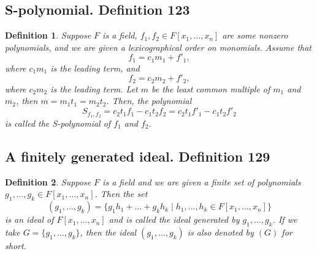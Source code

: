 \documentclass{article}
\newtheorem*{customdefinition}{Definition}
\begin{document}
\subsection*{S-polynomial. Definition 123}
\begin{customdefinition}
Suppose \( F \) is a field, \( f_1, f_2 \in F[x_1, \ldots, x_n] \) are some nonzero polynomials, and we are given a lexicographical order on monomials. Assume that 
\[
f_1 = c_1 m_1 + f'_1,
\]
where \( c_1 m_1 \) is the leading term, and
\[
f_2 = c_2 m_2 + f'_2,
\]
where \( c_2 m_2 \) is the leading term. Let \( m \) be the least common multiple of \( m_1 \) and \( m_2 \), then \( m = m_1 t_1 = m_2 t_2 \). Then, the polynomial
\[
S_{f_1, f_2} = c_2 t_1 f_1 - c_1 t_2 f_2 = c_2 t_1 f'_1 - c_1 t_2 f'_2
\]
is called the S-polynomial of \( f_1 \) and \( f_2 \).
\end{customdefinition}

\subsection*{A finitely generated ideal. Definition 129}
\begin{customdefinition}
Suppose \( F \) is a field and we are given a finite set of polynomials \( g_1, \ldots, g_k \in F[x_1, \ldots, x_n] \). Then the set
\[
(g_1, \ldots, g_k) = \{ g_1 h_1 + \ldots + g_k h_k \mid h_1, \ldots, h_k \in F[x_1, \ldots, x_n] \}
\]
is an ideal of \( F[x_1, \ldots, x_n] \) and is called the ideal generated by \( g_1, \ldots, g_k \). If we take \( G = \{ g_1, \ldots, g_k \} \), then the ideal \( (g_1, \ldots, g_k) \) is also denoted by \( (G) \) for short.
\end{customdefinition}
\end{document}
